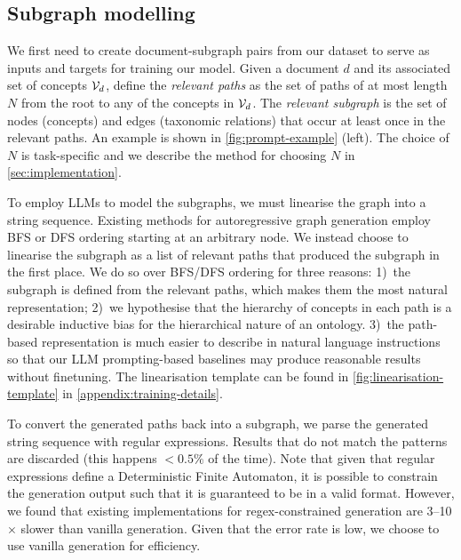 \subsection{Subgraph modelling}  \label{sec:method:subgraph}



We first need to create document-subgraph pairs from our dataset to serve as inputs and targets for training our model. Given a document $d$ and its associated set of concepts $\mathcal{V}_d$, define the \emph{relevant paths} as the set of paths of at most length $N$ from the root to any of the concepts in $\mathcal{V}_d$. The \emph{relevant subgraph} is the set of nodes (concepts) and edges (taxonomic relations) that occur at least once in the relevant paths. An example is shown in \cref{fig:prompt-example} (left). The choice of $N$ is task-specific and we describe the method for choosing $N$ in \cref{sec:implementation}.

To employ LLMs to model the subgraphs, we must linearise the graph into a string sequence. Existing methods for autoregressive graph generation employ BFS \cite{you2018graphrnn} or DFS \cite{goyal2020graphgen} ordering starting at an arbitrary node. We instead choose to linearise the subgraph as a list of relevant paths that produced the subgraph in the first place. We do so over BFS/DFS ordering for three reasons: 1)~the subgraph is defined from the relevant paths, which makes them the most natural representation; 2)~we hypothesise that the hierarchy of concepts in each path is a desirable inductive bias for the hierarchical nature of an ontology. 3)~the path-based representation is much easier to describe in natural language instructions so that our LLM prompting-based baselines may produce reasonable results without finetuning. The linearisation template can be found in \cref{fig:linearisation-template} in \cref{appendix:training-details}.

To convert the generated paths back into a subgraph, we parse the generated string sequence with regular expressions. Results that do not match the patterns are discarded (this happens $< 0.5\%$ of the time). Note that given that regular expressions define a Deterministic Finite Automaton, it is possible to constrain the generation output such that it is guaranteed to be in a valid format. However, we found that existing implementations \cite{willard2023efficient} for regex-constrained generation are 3--10$\times$ slower than vanilla generation. Given that the error rate is low, we choose to use vanilla generation for efficiency.

